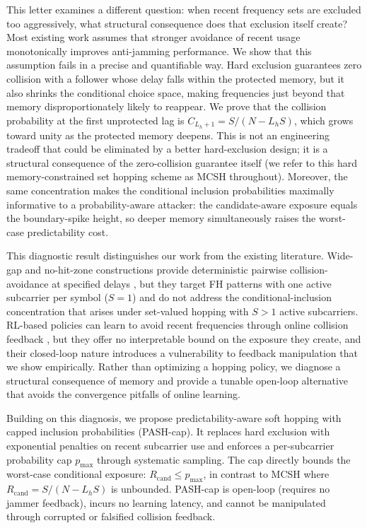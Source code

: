 \documentclass[letterpaper,journal,10pt]{IEEEtran}
\begin{document}
This letter examines a different question: when recent frequency sets
are excluded too aggressively, what structural consequence does that exclusion
itself create? Most existing work assumes that stronger avoidance of recent
usage monotonically improves anti-jamming performance. We show that this
assumption fails in a precise and quantifiable way. Hard exclusion guarantees
zero collision with a follower whose delay falls within the protected memory,
but it also shrinks the conditional choice space, making frequencies just
beyond that memory disproportionately likely to reappear. We prove that the
collision probability at the first unprotected lag is
$C_{L_h+1}=S/(N-L_hS)$, which grows toward unity as the protected memory
deepens. This is not an engineering tradeoff that could be eliminated by a
better hard-exclusion design; it is a structural consequence of the
zero-collision guarantee itself (we refer to this hard memory-constrained
set hopping scheme as MCSH throughout). Moreover, the same concentration makes the conditional
inclusion probabilities maximally informative to a probability-aware attacker:
the candidate-aware exposure equals the boundary-spike height, so deeper
memory simultaneously raises the worst-case predictability cost.

This diagnostic result distinguishes our work from the existing literature.
Wide-gap and no-hit-zone constructions provide deterministic pairwise
collision-avoidance at specified delays \cite{shu2024widegap,zheng2025widegap},
but they target FH patterns with one active subcarrier per symbol ($S=1$) and do
not address the conditional-inclusion concentration that arises under set-valued
hopping with $S>1$ active subcarriers. RL-based policies can learn to avoid
recent frequencies through online collision feedback \cite{zhou2024,zhang2024block},
but they offer no interpretable bound on the exposure they create, and their
closed-loop nature introduces a vulnerability to feedback manipulation that we
show empirically. Rather than optimizing a hopping policy, we diagnose
a structural consequence of memory and provide a tunable open-loop alternative
that avoids the convergence pitfalls of online learning.

Building on this diagnosis, we propose predictability-aware soft hopping with
capped inclusion probabilities (PASH-cap). It replaces hard exclusion with
exponential penalties on recent subcarrier use and enforces a per-subcarrier
probability cap $p_{\max}$ through systematic sampling. The cap directly bounds
the worst-case conditional exposure: $R_{\mathrm{cand}}\leq p_{\max}$, in
contrast to MCSH where $R_{\mathrm{cand}}=S/(N-L_hS)$ is unbounded.
PASH-cap is open-loop (requires no jammer feedback), incurs no learning
latency, and cannot be manipulated through corrupted or falsified collision feedback.
\end{document}
